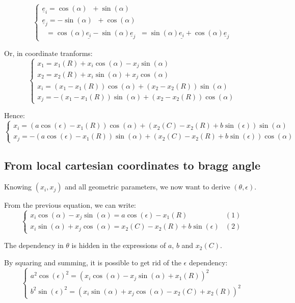 \documentclass[a4paper,11pt,twoside,titlepage,openright]{book}
\numberwithin{equation}{section}
\newcommand{\ud}[1]{\underline{#1}}
\newcommand{\lt}{\left}
\newcommand{\rt}{\right}
\DeclareMathOperator{\ei}{\underline{e}_1}
\DeclareMathOperator{\et}{\underline{e}_2}
\begin{document}
$$
\lt\{
	\begin{array}{lll}
		\ud{e}_i = \cos(\alpha)\ei + \sin(\alpha)\et\\
		\ud{e}_j = -\sin(\alpha)\ei + \cos(\alpha)\et\\
		\ei = \cos(\alpha)\ud{e_i} - \sin(\alpha)\ud{e}_j
		\et = \sin(\alpha)\ud{e_i} + \cos(\alpha)\ud{e}_j
	\end{array}
\rt.
$$

Or, in coordinate tranforms:
$$
\lt\{
	\begin{array}{lll}
		x_1 = x_1(R) + x_i\cos(\alpha) - x_j\sin(\alpha)\\
		x_2 = x_2(R) + x_i\sin(\alpha) + x_j\cos(\alpha)\\
		x_i = (x_1-x_1(R))\cos(\alpha) + (x_2-x_2(R))\sin(\alpha)\\
		x_j = -(x_1-x_1(R))\sin(\alpha) + (x_2-x_2(R))\cos(\alpha)
	\end{array}
\rt.
$$

Hence:
$$
\lt\{
	\begin{array}{lll}
		x_i = \lt(a\cos(\epsilon)-x_1(R)\rt)\cos(\alpha) + \lt(x_2(C)-x_2(R) + b\sin(\epsilon)\rt)\sin(\alpha)\\
		x_j = -\lt(a\cos(\epsilon)-x_1(R)\rt)\sin(\alpha) + \lt(x_2(C)-x_2(R) + b\sin(\epsilon)\rt)\cos(\alpha)
	\end{array}
\rt.
$$


\subsection{From local cartesian coordinates to bragg angle}

Knowing $(x_i, x_j)$ and all geometric parameters, we now want to derive $(\theta, \epsilon)$.

From the previous equation, we can write:
$$
\lt\{
	\begin{array}{lll}
        x_i\cos(\alpha) - x_j\sin(\alpha) = a\cos(\epsilon)-x_1(R) & (1)\\
        x_i\sin(\alpha) + x_j\cos(\alpha) = x_2(C)-x_2(R) + b\sin(\epsilon) &
        (2)
	\end{array}
\rt.
$$

The dependency in $\theta$ is hidden in the expressions of $a$, $b$ and
$x_2(C)$.

By squaring and summing, it is possible to get rid of the $\epsilon$
dependency:
$$
\lt\{
	\begin{array}{lll}
        a^2\cos(\epsilon)^2 = \lt(x_i\cos(\alpha) - x_j\sin(\alpha) +
        x_1(R)\rt)^2\\
        b^2\sin(\epsilon)^2 = \lt(x_i\sin(\alpha) + x_j\cos(\alpha) - x_2(C) +
        x_2(R)\rt)^2
	\end{array}
\rt.
$$
\end{document}
